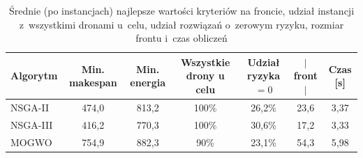 \begin{table}[htbp]
    \centering
    \caption{Średnie (po instancjach) najlepsze wartości kryteriów na froncie, udział instancji z~wszystkimi dronami u~celu, udział rozwiązań o~zerowym ryzyku, rozmiar frontu i~czas obliczeń}
    \label{tab:objectives}
    \begin{tabular}{l c c c c c c}
        \hline
        Algorytm & Min. makespan & Min. energia & Wszystkie drony u celu & Udział ryzyka $= 0$ & $|$front$|$ & Czas [s] \\
        \hline
        NSGA-II & 474{,}0 & 813{,}2 & 100\% & 26{,}2\% & 23{,}6 & 3{,}37 \\
        NSGA-III & 416{,}2 & 770{,}3 & 100\% & 30{,}6\% & 17{,}2 & 3{,}33 \\
        MOGWO & 754{,}9 & 882{,}3 & 90\% & 23{,}1\% & 54{,}3 & 5{,}98 \\
        \hline
    \end{tabular}
\end{table}
